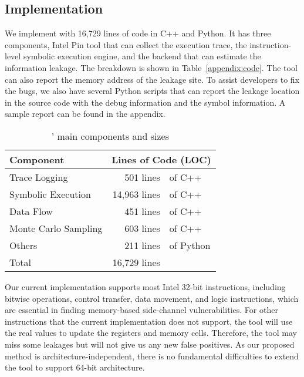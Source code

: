 \subsection{Implementation}
We implement \tool{} with 16,729 lines of code in C++ and Python. It has three
components, Intel Pin tool that can collect the execution trace, the
instruction-level symbolic execution engine, and the backend that can estimate
the information leakage. The breakdown is shown in
Table~\ref{appendix:code}. The tool can also report the memory address of
the leakage site. To assist developers to fix the bugs, we also have several
Python scripts that can report the leakage location in the source code with the
debug information and the symbol information. A sample report can be found in
the appendix.

\label{appendix:code}
\begin{table}[h!]
    \centering
    \caption{\tool{}' main components and sizes}\label{tbl:implementation}
    \begin{tabular}{lr@{~}@{}l}
        \hline
        Component            & \multicolumn{2}{c}{Lines of Code (LOC)}             \\ \hline
        Trace Logging        & 501 lines                               & of C++    \\
        Symbolic Execution   & 14,963 lines                            & of C++    \\
        Data Flow            & 451 lines                               & of C++    \\
        Monte Carlo Sampling & 603 lines                               & of C++    \\
        Others               & 211 lines                               & of Python \\ \hline
        Total                & 16,729 lines                            &           \\\hline
    \end{tabular}
\end{table}

Our current implementation supports most Intel 32-bit instructions,
including bitwise operations, control transfer, data movement, and logic
instructions, which are essential in finding memory-based side-channel
vulnerabilities. For other instructions that the current implementation does not
support, the tool will use the real values to update the registers and memory
cells. Therefore, the tool may miss some leakages but will not give us any new
false positives. As our proposed method is architecture-independent,
there is no fundamental difficulties to extend the tool to support 64-bit
architecture. 
